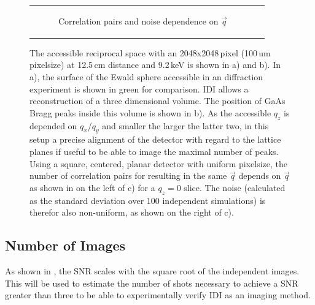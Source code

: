 \begin{figure}[!htb]
\begin{tabular}[t]{cc}
\begin{subfigure}{0.52\textwidth}
	\caption{Correlation pairs and noise dependence on $\vec{q}$ } 
\end{subfigure}\\
	\end{tabular}
	\caption[Accessible reciprocal space]{The accessible reciprocal space with an 2048x2048\,pixel (100\,um pixelsize) at 12.5\,cm distance and 9.2\,keV is shown in a) and b). In a), the surface of the Ewald sphere accessible in an diffraction experiment is shown in green for comparison. IDI allows a reconstruction of a three dimensional volume. The position of GaAs Bragg peaks inside this volume is shown in b). As the accessible $q_z$ is depended on $q_x$/$q_y$ and smaller the larger the latter two, in this setup a precise alignment of the detector with regard to the lattice planes if useful to be able to image the maximal number of peaks. Using a square, centered, planar detector with uniform pixelsize, the number of correlation pairs for resulting in the same $\vec{q}$ depends on $\vec{q}$ as shown in on the left of c) for a $q_z=0$ slice. The noise (calculated as the standard deviation over 100 independent simulations) is therefor also non-uniform, as shown on the right of c).}
	
\end{figure}



\subsection{Number of Images}
As shown in , the SNR scales with  the square root of the independent images. This will be used to estimate the number of shots necessary to achieve a SNR greater than three to be able to experimentally verify IDI as an imaging method.
 
